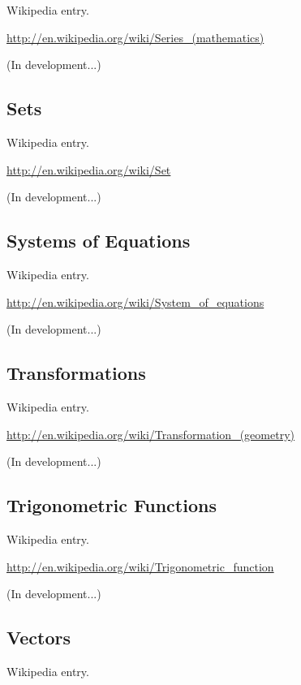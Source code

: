 \documentclass[12pt,oneside]{book}
\begin{document}
Wikipedia entry.

\href{http://en.wikipedia.org/wiki/Series_(mathematics)}{http://en.wikipedia.org/wiki/Series\_(mathematics)}

(In development...)

\subsection[Sets]{Sets}

Wikipedia entry.

\href{http://en.wikipedia.org/wiki/Set}{http://en.wikipedia.org/wiki/Set}

(In development...)

\subsection[Systems of Equations]{Systems of Equations}

Wikipedia entry.

\href{http://en.wikipedia.org/wiki/System_of_equations}{http://en.wikipedia.org/wiki/System\_of\_equations}

(In development...)

\subsection[Transformations]{Transformations}

Wikipedia entry.

\href{http://en.wikipedia.org/wiki/Transformation_(geometry)}{http://en.wikipedia.org/wiki/Transformation\_(geometry)}

(In development...)

\subsection[Trigonometric Functions]{ Trigonometric Functions}

Wikipedia entry.

\href{http://en.wikipedia.org/wiki/Trigonometric_function}{http://en.wikipedia.org/wiki/Trigonometric\_function}

(In development...)

\subsection[Vectors]{Vectors}

Wikipedia entry.
\end{document}
